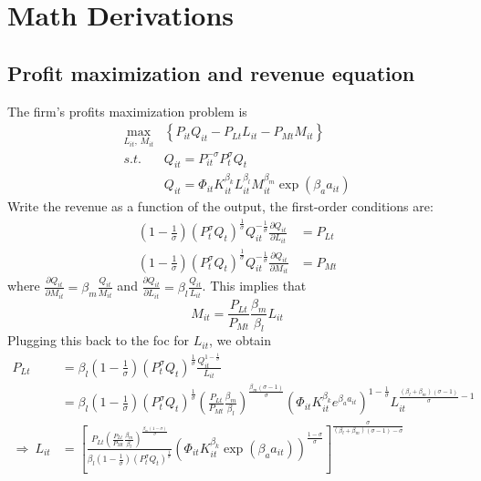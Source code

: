 \documentclass[11pt]{article}
\begin{document}
\section{Math Derivations} \label{app_revenue_equation}
\subsection*{Profit maximization and revenue equation} \label{app_revenue_equation}
The firm's profits maximization problem is
\begin{align*}
\max_{L_{it},\,M_{it}} & \left\{ P_{it}Q_{it}-P_{Lt}L_{it}-P_{Mt}M_{it}\right\} \\
s.t.\, & Q_{it}=P_{it}^{-\sigma}P_{t}^{\sigma}Q_{t}\\
 & Q_{it}=\Phi_{it}K_{it}^{\beta_{k}}L_{it}^{\beta_{l}}M_{it}^{\beta_{m}}\exp\left(\beta_{a}a_{it}\right)
\end{align*}
Write the revenue as a function of the output, the first-order conditions
are:
\begin{align}
\left(1-\frac{1}{\sigma}\right)\left(P_{t}^{\sigma}Q_{t}\right)^{\frac{1}{\sigma}}Q_{it}^{-\frac{1}{\sigma}}\frac{\partial Q_{it}}{\partial L_{it}} & =P_{Lt}\\
\left(1-\frac{1}{\sigma}\right)\left(P_{t}^{\sigma}Q_{t}\right)^{\frac{1}{\sigma}}Q_{it}^{-\frac{1}{\sigma}}\frac{\partial Q_{it}}{\partial M_{it}} & =P_{Mt}
\end{align}
where $\frac{\partial Q_{it}}{\partial M_{it}}=\beta_{m}\frac{Q_{it}}{M_{it}}$
and $\frac{\partial Q_{it}}{\partial L_{it}}=\beta_{l}\frac{Q_{it}}{L_{it}}$.
This implies that 
\begin{equation}
M_{it}=\frac{P_{Lt}}{P_{Mt}}\frac{\beta_{m}}{\beta_{l}}L_{it}
\end{equation}
Plugging this back to the foc for $L_{it}$, we obtain
\begin{align}
P_{Lt} & =\beta_{l}\left(1-\frac{1}{\sigma}\right)\left(P_{t}^{\sigma}Q_{t}\right)^{\frac{1}{\sigma}}\frac{Q_{it}^{1-\frac{1}{\sigma}}}{L_{it}}\nonumber \\
 & =\beta_{l}\left(1-\frac{1}{\sigma}\right)\left(P_{t}^{\sigma}Q_{t}\right)^{\frac{1}{\sigma}}\left(\frac{P_{Lt}}{P_{Mt}}\frac{\beta_{m}}{\beta_{l}}\right)^{\frac{\beta_{m}\left(\sigma-1\right)}{\sigma}}\left(\Phi_{it}K_{it}^{\beta_{k}}e^{\beta_{a}a_{it}}\right)^{1-\frac{1}{\sigma}}L_{it}^{\frac{\left(\beta_{l}+\beta_{m}\right)\left(\sigma-1\right)}{\sigma}-1}\nonumber \\
\Rightarrow\:L_{it} & =\left[\frac{P_{Lt}\left(\frac{P_{Lt}}{P_{Mt}}\frac{\beta_{m}}{\beta_{l}}\right)^{\frac{\beta_{m}\left(1-\sigma\right)}{\sigma}}}{\beta_{l}\left(1-\frac{1}{\sigma}\right)\left(P_{t}^{\sigma}Q_{t}\right)^{\frac{1}{\sigma}}}\left(\Phi_{it}K_{it}^{\beta_{k}}\exp\left(\beta_{a}a_{it}\right)\right)^{\frac{1-\sigma}{\sigma}}\right]^{\frac{\sigma}{\left(\beta_{l}+\beta_{m}\right)\left(\sigma-1\right)-\sigma}}
\end{align}
\end{document}
